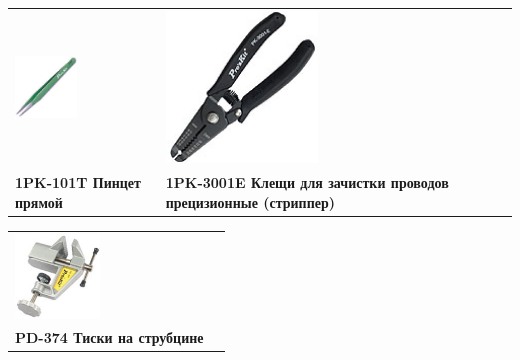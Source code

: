 \begin{tabular}{p{} p{}}
\noindent\includegraphics[width=0.45\textwidth]{tech/tools/proskit/1PK-101T.jpg}
&
\noindent\includegraphics[width=0.45\textwidth]{tech/tools/proskit/1PK-3001E.jpg}
\\
\textbf{1PK-101T Пинцет прямой}
&
\textbf{1PK-3001E Клещи для зачистки проводов прецизионные (стриппер)}
\\
\end{tabular}
\clearpage

\begin{tabular}{p{} p{}}
\noindent\includegraphics[width=0.45\textwidth]{tech/tools/proskit/PD-374.jpg}
&\\
\textbf{PD-374 Тиски на струбцине}
&\\
\end{tabular}
\clearpage

%
%
%
%
